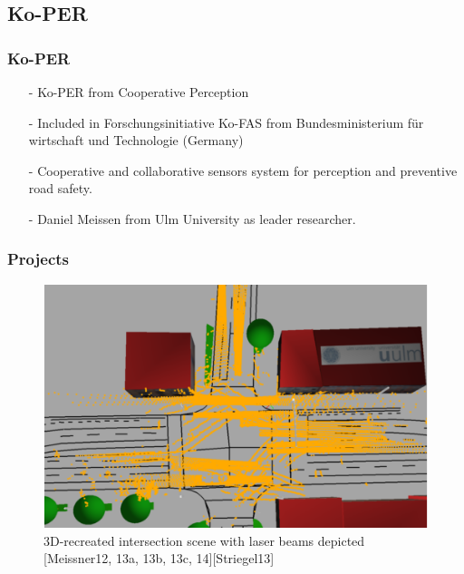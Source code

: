 \documentclass[table]{beamer}
\begin{document}
\subsection*{Ko-PER}
\frame
{
	\frametitle{Ko-PER}
	\begin{itemize}
		\item[-] Ko-PER from Cooperative Perception
		\item[-] Included in Forschungsinitiative Ko-FAS from Bundesministerium für wirtschaft und Technologie (Germany)
		\item[-] Cooperative and collaborative sensors system for perception and preventive road safety.
		\item[-] Daniel Meissen from Ulm University as leader researcher.
	\end{itemize}
}
\frame
{
	\frametitle{Projects}	
	\begin{figure}
		\includegraphics[scale=0.4]{fig/meiss1.png}
		\caption{3D-recreated intersection scene with laser beams depicted [Meissner12, 13a, 13b, 13c, 14][Striegel13]}
	\end{figure}
}
\end{document}
